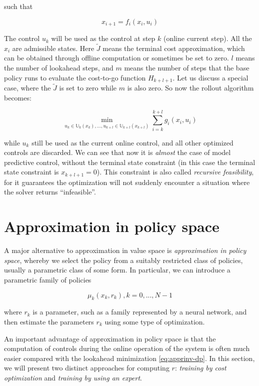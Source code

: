\documentclass[
]{book}
\theoremstyle{definition}
\theoremstyle{definition}
\theoremstyle{definition}
\theoremstyle{definition}
\theoremstyle{remark}
\begin{document}
such that

\begin{equation}
x_{i+1} = f_i(x_i,u_i)
\end{equation}

The control \(u_k\) will be used as the control at step \(k\) (online current step). All the \(x_i\) are admissible states. Here \(\tilde J\) means the terminal cost approximation, which can be obtained through offline computation or sometimes be set to zero. \(l\) means the number of lookahead steps, and \(m\) means the number of steps that the base policy runs to evaluate the cost-to-go function \(H_{k+l+1}\). Let us discuss a special case, where the \(\tilde J\) is set to zero while \(m\) is also zero. So now the rollout algorithm becomes:

\begin{equation}
\min_{u_k \in \mathbb U_k(x_k), ..., u_{k+l} \in \mathbb U_{k+l}(x_{k+l})} \sum_{i=k}^{k+l} g_i(x_i, u_i)
\end{equation}

while \(u_k\) still be used as the current online control, and all other optimized controls are discarded. We can see that now it is \emph{almost} the case of model predictive control, without the terminal state constraint (in this case the terminal state constraint is \(x_{k+l+1}=0\)). This constraint is also called \emph{recursive feasibility}, for it guarantees the optimization will not suddenly encounter a situation where the solver returns ``infeasible''.

\hypertarget{approximation-in-policy-space}{%
\section{Approximation in policy space}\label{approximation-in-policy-space}}

A major alternative to approximation in value space is \emph{approximation in policy space}, whereby we select the policy from a suitably restricted class of policies, usually a parametric class of some form. In particular, we can introduce a parametric family of policies

\begin{equation}
\mu_k(x_k,r_k), k=0,...,N-1
\end{equation}

where \(r_k\) is a parameter, such as a family represented by a neural network, and then estimate the parameters \(r_k\) using some type of optimization.

An important advantage of approximation in policy space is that the computation of controls during the online operation of the system is often much easier compared with the lookahead minimization \eqref{eq:apprinv-dp}. In this section, we will present two distinct approaches for computing \(r\): \emph{training by cost optimization} and \emph{training by using an expert}.
\end{document}
